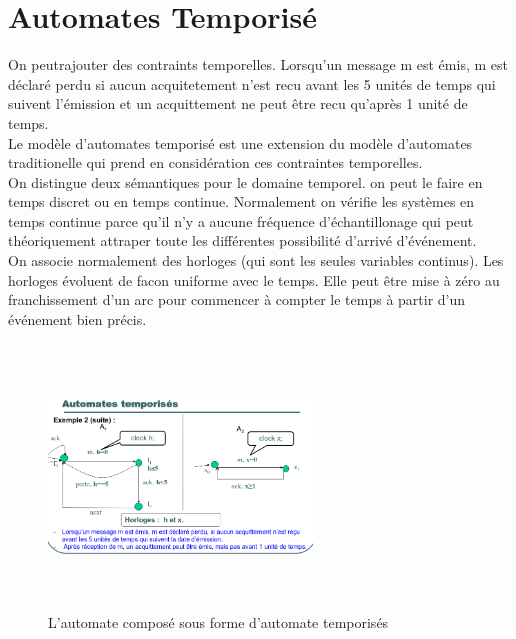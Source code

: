 \documentclass[oneside]{book}
\begin{document}
    
    
    
    \section{Automates Temporisé}
    On peutrajouter des contraints temporelles. Lorsqu'un message m est émis, m est déclaré perdu si aucun acquitetement n'est recu avant les 5 unités de temps qui suivent l'émission et un acquittement ne peut être recu qu'après 1 unité de temps.\\
    
    Le modèle d'automates temporisé est une extension du modèle d'automates traditionelle qui prend en considération ces contraintes temporelles.\\
    
    On distingue deux sémantiques pour le domaine temporel. on peut le faire en temps discret ou en temps continue. Normalement on vérifie les systèmes en temps continue parce qu'il n'y a aucune fréquence d'échantillonage qui peut théoriquement attraper toute les différentes possibilité d'arrivé d'événement.\\
    
    On associe normalement des horloges (qui sont les seules variables continus). Les horloges évoluent de facon uniforme avec le temps. Elle peut être mise à zéro au franchissement d'un arc pour commencer à compter le temps à partir d'un événement bien précis.\\
    
    \begin{figure}[!ht]
    	\centering
    	\includegraphics[width = 7cm, height = 7cm, keepaspectratio]{Images/automate_temporise.png}
    	\caption{L'automate composé sous forme d'automate temporisés}
    	\label{fig:AutomateTemporise}
    \end{figure}
    
\end{document}

